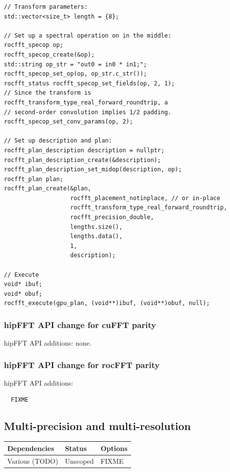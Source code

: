 \documentclass[12pt]{article}
\renewcommand{\(}{\left(}
\renewcommand{\)}{\right)}
\begin{document}
\begin{lstlisting}
// Transform parameters:  
std::vector<size_t> length = {8};

// Set up a spectral operation on in the middle:
rocfft_specop op;
rocfft_specop_create(&op);
std::string op_str = "out0 = in0 * in1;";
rocfft_specop_set_op(op, op_str.c_str());
rocfft_status rocfft_specop_set_fields(op, 2, 1);
// Since the transform is rocfft_transform_type_real_forward_roundtrip, a
// second-order convolution implies 1/2 padding.
rocfft_specop_set_conv_params(op, 2); 

// Set up description and plan:
rocfft_plan_description description = nullptr;
rocfft_plan_description_create(&description);
rocfft_plan_description_set_midop(description, op);
rocfft_plan plan;
rocfft_plan_create(&plan,
                   rocfft_placement_notinplace, // or in-place
                   rocfft_transform_type_real_forward_roundtrip,
                   rocfft_precision_double,
                   lengths.size(),
                   lengths.data(),
                   1,
                   description);

// Execute
void* ibuf;
void* obuf;
rocfft_execute(gpu_plan, (void**)ibuf, (void**)obuf, null);
\end{lstlisting}


\subsubsection{hipFFT API change for cuFFT parity}

hipFFT API additions: none.

\subsubsection{hipFFT API change for rocFFT parity}
\noindent
hipFFT API additions:
\begin{lstlisting}
  FIXME
\end{lstlisting}


\newpage
\subsection{Multi-precision and multi-resolution}


\begin{center}
  \begin{tabular}{|l|l|l|}
    \hline
    Dependencies & Status & Options \\
    \hline
    Various (TODO) & Unscoped  & FIXME \\
    \hline
  \end{tabular}
\end{center}
\end{document}
